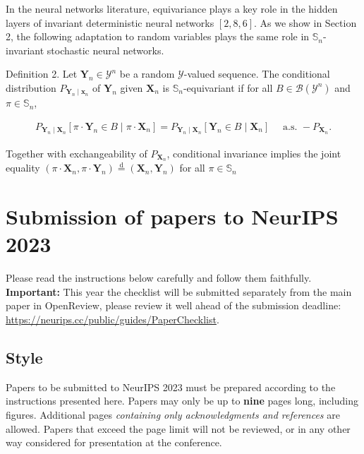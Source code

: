 \documentclass{article}
\begin{document}
In the neural networks literature, equivariance plays a key role in the hidden layers of invariant deterministic neural networks $[2,8,6]$. As we show in Section 2, the following adaptation to random variables plays the same role in $\mathbb{S}_n$-invariant stochastic neural networks.

Definition 2. Let $\mathbf{Y}_n \in \mathcal{Y}^n$ be a random $\mathcal{Y}$-valued sequence. The conditional distribution $P_{\mathbf{Y}_n \mid \mathbf{x}_n}$ of $\mathbf{Y}_n$ given $\mathbf{X}_n$ is $\mathbb{S}_n$-equivariant if for all $B \in \mathcal{B}\left(\mathcal{Y}^n\right)$ and $\pi \in \mathbb{S}_n$,

\begin{align}
P_{\mathbf{Y}_n \mid \mathbf{X}_n}\left[\pi \cdot \mathbf{Y}_n \in B \mid \pi \cdot \mathbf{X}_n\right]=P_{\mathbf{Y}_n \mid \mathbf{X}_n}\left[\mathbf{Y}_n \in B \mid \mathbf{X}_n\right] \quad \text { a.s. }-P_{\mathbf{X}_n} .
\end{align}

Together with exchangeability of $P_{\mathbf{X}_n}$, conditional invariance implies the joint equality $\left(\pi \cdot \mathbf{X}_n, \pi \cdot \mathbf{Y}_n\right) \stackrel{\mathrm{d}}{=}\left(\mathbf{X}_n, \mathbf{Y}_n\right)$ for all $\pi \in \mathbb{S}_n$


\section{Submission of papers to NeurIPS 2023}


Please \cite{vaswani2017attention} read the instructions below carefully and follow them faithfully. \textbf{Important:} This year the checklist will be submitted separately from the main paper in OpenReview, please review it well ahead of the submission deadline: \url{https://neurips.cc/public/guides/PaperChecklist}.


\subsection{Style}


Papers to be submitted to NeurIPS 2023 must be prepared according to the
instructions presented here. Papers may only be up to {\bf nine} pages long,
including figures. Additional pages \emph{containing only acknowledgments and
references} are allowed. Papers that exceed the page limit will not be
reviewed, or in any other way considered for presentation at the conference.
\end{document}
